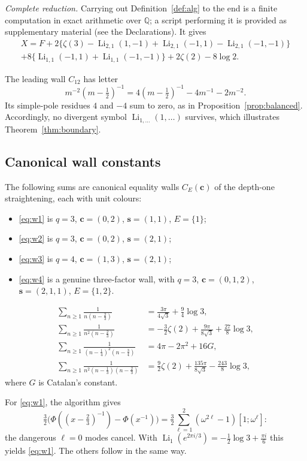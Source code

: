 \documentclass[11pt]{amsart}
\theoremstyle{definition}
\theoremstyle{remark}
\numberwithin{equation}{section}
\newcommand{\Q}{\mathbb{Q}}
\newcommand{\Li}{\operatorname{Li}}
\newcommand{\s}{\mathbf{s}}
\newcommand{\cb}{\mathbf{c}}
\begin{document}
\emph{Complete reduction.} Carrying out Definition~\ref{def:alg} to the end is a finite computation in exact arithmetic over $\Q$; a script performing it is provided as supplementary material (see the Declarations). It gives
\begin{multline*}
X=F+2\big\{\zeta(3)-\Li_{2,1}(1,-1)+\Li_{2,1}(-1,1)-\Li_{2,1}(-1,-1)\big\}\\
+8\big\{\Li_{1,1}(-1,1)+\Li_{1,1}(-1,-1)\big\}+2\zeta(2)-8\log2 .
\end{multline*}

The leading wall $C_{12}$ has letter
\[
m^{-2}(m-\tfrac12)^{-1}=4(m-\tfrac12)^{-1}-4m^{-1}-2m^{-2}.
\]
Its simple-pole residues $4$ and $-4$ sum to zero, as in Proposition~\ref{prop:balanced}. Accordingly, no divergent symbol $\Li_{1,\dots}(1,\dots)$ survives, which illustrates Theorem~\ref{thm:boundary}.

\subsection{Canonical wall constants}
The following sums are canonical equality walls $C_E(\cb)$ of the depth-one straightening, each with unit colours:
\begin{itemize}[leftmargin=1.5em]
\item \eqref{eq:w1} is $q=3$, $\cb=(0,2)$, $\s=(1,1)$, $E=\{1\}$;
\item \eqref{eq:w2} is $q=3$, $\cb=(0,2)$, $\s=(2,1)$;
\item \eqref{eq:w3} is $q=4$, $\cb=(1,3)$, $\s=(2,1)$;
\item \eqref{eq:w4} is a genuine three-factor wall, with $q=3$, $\cb=(0,1,2)$, $\s=(2,1,1)$, $E=\{1,2\}$.
\end{itemize}
\begin{align}
\sum_{n\ge1}\frac1{n(n-\frac23)}&=\frac{3\pi}{4\sqrt3}+\frac94\log3,\label{eq:w1}\\
\sum_{n\ge1}\frac1{n^2(n-\frac23)}&=-\frac32\zeta(2)+\frac{9\pi}{8\sqrt3}+\frac{27}{8}\log3,\label{eq:w2}\\
\sum_{n\ge1}\frac1{(n-\frac14)^2(n-\frac34)}&=4\pi-2\pi^2+16G,\label{eq:w3}\\
\sum_{n\ge1}\frac1{n^2(n-\frac13)(n-\frac23)}&=\frac92\zeta(2)+\frac{135\pi}{8\sqrt3}-\frac{243}{8}\log3,\label{eq:w4}
\end{align}
where $G$ is Catalan's constant.

For \eqref{eq:w1}, the algorithm gives
\[
\tfrac32\big(\Phi((x-\tfrac23)^{-1})-\Phi(x^{-1})\big)=\tfrac32\sum_{\ell=1}^{2}(\omega^{2\ell}-1)[1;\omega^\ell]:
\]
the dangerous $\ell=0$ modes cancel. With $\Li_1(e^{2\pi i/3})=-\tfrac12\log3+\tfrac{\pi i}{6}$ this yields \eqref{eq:w1}. The others follow in the same way.
\end{document}

